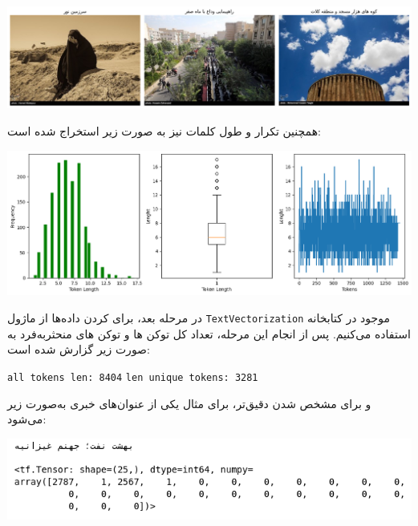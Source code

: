 \begin{qsolve}
	\begin{center}
		\includegraphics*[width=1\linewidth]{pics/img22.png}
		\label{تصاویری از دیتاست}
	\end{center}
	
	همچنین تکرار و طول کلمات نیز به صورت زیر استخراج شده است:
	
	\begin{center}
		\includegraphics*[width=0.8\linewidth]{pics/img23.png}
		\label{طول و تکرار کلمات در دیتاست}
	\end{center}
	
	در مرحله بعد، برای  کردن داده‌ها از ماژول \texttt{TextVectorization} موجود در کتابخانه  استفاده می‌کنیم. پس از انجام این مرحله، تعداد کل توکن ها و توکن های منحثر‌به‌فرد به صورت زیر گزارش شده است:
	
	\begin{latin}
		\texttt{all tokens len: 8404}
		\texttt{len unique tokens: 3281}
	\end{latin}
	
	
	و برای مشخص شدن دقیق‌تر، برای مثال یکی از عنوان‌های خبری به‌صورت زیر  می‌شود:
	
	\begin{center}
		\includegraphics*[width=0.8\linewidth]{pics/img24.png}
		\label{عنوان tokenize شده}
	\end{center}
	
	
	
\end{qsolve}